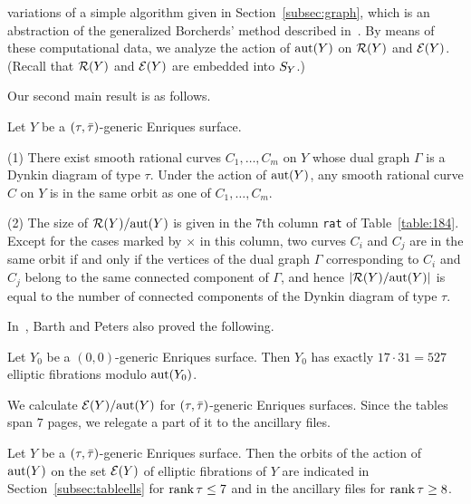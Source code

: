 \documentclass{amsart}
\numberwithin{procedure}{section}
\begin{document}
variations of
a simple algorithm given in Section~\ref{subsec:graph},
which is an abstraction of the generalized Borcherds' method 
described in~\cite{Shimada2015}.
By means of these computational data,
we analyze the action of $\mathord{\rm{aut}}(Y)$ on 
$\mathord{\mathcal R}(Y)$ and $\mathord{\mathcal E}(Y)$.
(Recall that $\mathord{\mathcal R}(Y)$ and $\mathord{\mathcal E}(Y)$ 
are embedded into $S_{Y}$.)
\par
Our second main result is as follows.
%
%
\begin{theorem}\label{thm:main2rats}
Let $Y$ be a $(\tau, \bar{\tau})$-generic Enriques surface.
\par
{\rm (1)}
There exist smooth rational curves $C_1, \dots, C_m$ on $Y$ 
whose dual graph $\Gamma$ 
is a Dynkin diagram of type $\tau$.
Under the action of $\mathord{\rm{aut}}(Y)$, 
any smooth rational curve $C$ on $Y$
is in the same orbit 
as one of  $C_1, \dots, C_m$.
\par
{\rm (2)} 
The size of $\mathord{\mathcal R}(Y) /\mathord{\rm{aut}}(Y)$ is given in the $7$th column {\tt rat} of
Table~\ref{table:184}.
Except for the cases marked by $\times$ in this column,
two curves $C_i$ and $C_j$ are in the same orbit 
if and only if the vertices of the dual graph $\Gamma$ corresponding to
$C_i$ and $C_j$
belong to the same connected component of $\Gamma$,
and hence   
$|\mathord{\mathcal R}(Y)/\mathord{\rm{aut}}(Y)|$ is equal to the number of  connected components
of the Dynkin diagram of type $\tau$.
\end{theorem}
%
In~\cite{BP1983}, Barth and Peters also proved the following.
%
\begin{theorem}\label{thm:BP2}
Let $Y_0$ be a $(0,0)$-generic  Enriques surface.
Then $Y_0$ has exactly $17\cdot 31=527$ elliptic fibrations modulo $\mathord{\rm{aut}}(Y_0)$.
\end{theorem}
%
%
We calculate $\mathord{\mathcal E}(Y)/\mathord{\rm{aut}}(Y)$ for $(\tau, \bar{\tau})$-generic Enriques surfaces.
Since the tables span $7$ pages, we
relegate a part of it to the ancillary files.
%
\begin{theorem}\label{thm:main3ells}
Let $Y$ be a $(\tau,\bar{\tau})$-generic Enriques surface.
Then  the orbits of the action of $\mathord{\rm{aut}}(Y)$ on the set $\mathord{\mathcal E}(Y)$
of elliptic fibrations of $Y$
are indicated in {\rm Section~\ref{subsec:tableells}} 
for $\operatorname{\mathrm{rank}}\nolimits \tau \le 7$ and in the ancillary files \cite{AutEnrVolCompdata} for $\operatorname{\mathrm{rank}}\nolimits \tau \geq 8$.
\end{theorem}
%
%
%
\end{document}
